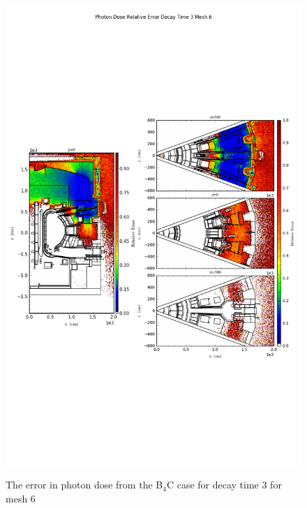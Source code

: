 \begin{figure}[ht!]
\centering
\includegraphics[trim={0cm 9cm 0cm 10cm},clip,scale=0.75]{../plots/final_model_with_b4c/Photon_Dose_Relative_Error_Decay_Time_3_Mesh_6.png}
\label{fig:photons_dc3_no4bc_m6_error}
\caption{The error in photon dose from the B$_4$C case for decay time 3 for mesh 6}
\end{figure}
